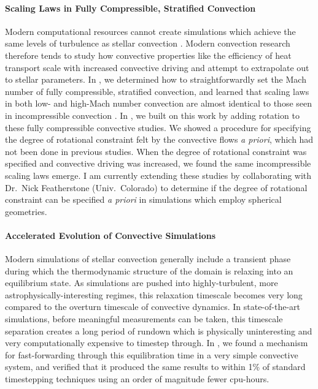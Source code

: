\documentclass[onecolumn, hmargin=1in, vmargin=1in]{aastex62}
\begin{document}
\paragraph{Scaling Laws in Fully Compressible, Stratified Convection}
Modern computational resources cannot create simulations which achieve the same levels of turbulence as stellar convection \citep{brummell&all2002}.
Modern convection research therefore tends to study how convective properties like the efficiency of heat transport scale with increased convective driving and attempt to extrapolate out to stellar parameters.
In \citet{anders&brown2017}, we determined how to straightforwardly set the Mach number of fully compressible, stratified convection, and learned that scaling laws in both low- and high-Mach number convection are almost identical to those seen in incompressible convection \citep{ahlers&all2009}.
In \citet{anders&all2019}, we built on this work by adding rotation to these fully compressible convective studies.
We showed a procedure for specifying the degree of rotational constraint felt by the convective flows \emph{a priori}, which had not been done in previous studies.
When the degree of rotational constraint was specified and convective driving was increased, we found the same incompressible scaling laws emerge.
I am currently extending these studies by collaborating with Dr.~Nick Featherstone (Univ.~Colorado) to determine if the degree of rotational constraint can be specified \emph{a priori} in simulations which employ spherical geometries.

\paragraph{Accelerated Evolution of Convective Simulations}
Modern simulations of stellar convection generally include a transient phase during which the thermodynamic structure of the domain is relaxing into an equilibrium state.
As simulations are pushed into highly-turbulent, more astrophysically-interesting regimes, this relaxation timescale becomes very long compared to the overturn timescale of convective dynamics.
In state-of-the-art simulations, before meaningful measurements can be taken, this timescale separation creates a long period of rundown which is physically uninteresting and very computationally expensive to timestep through.
In \citet{anders&all2018}, we found a mechanism for fast-forwarding through this equilibration time in a very simple convective system, and verified that it produced the same results to within 1\% of standard timestepping techniques using an order of magnitude fewer cpu-hours.
\end{document}
